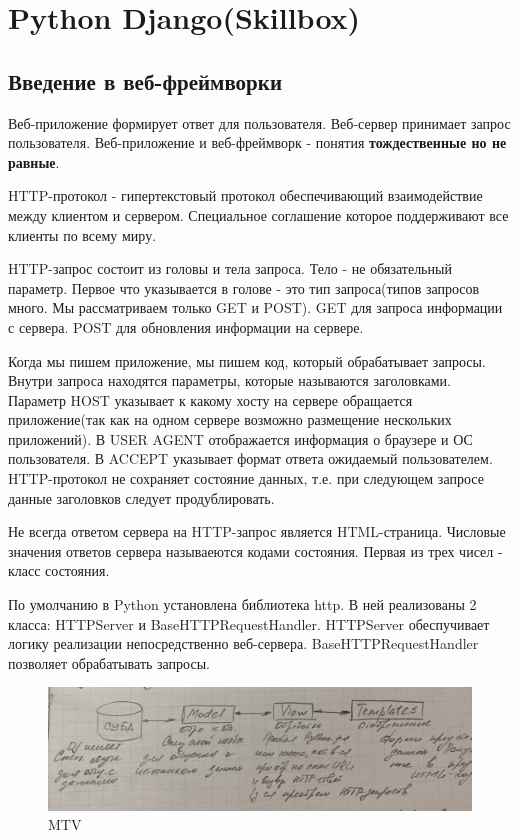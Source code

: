 \documentclass[%
	11pt,
	a4paper,
	utf8,
		]{article}
\begin{document}
\section{Python Django(Skillbox)}

\subsection{Введение в веб-фреймворки}

Веб-приложение формирует ответ для пользователя. Веб-сервер принимает запрос пользователя. Веб-приложение и веб-фреймворк - понятия \textbf{тождественные но не равные}.

HTTP-протокол - гипертекстовый протокол обеспечивающий взаимодействие между клиентом и сервером. Специальное соглашение которое поддерживают все клиенты по всему миру. 

HTTP-запрос состоит из головы и тела запроса. Тело - не обязательный параметр. Первое что указывается в голове - это тип запроса(типов запросов много. Мы рассматриваем только GET и POST). GET для запроса информации с сервера. POST для обновления информации на сервере.

Когда мы пишем приложение, мы пишем код, который обрабатывает запросы. Внутри запроса находятся параметры, которые называются заголовками. Параметр HOST указывает к какому хосту на сервере обращается приложение(так как на одном сервере возможно размещение нескольких приложений). В USER AGENT отображается информация о браузере и ОС пользователя. В ACCEPT указывает формат ответа ожидаемый пользователем. HTTP-протокол не сохраняет состояние данных, т.е. при следующем запросе данные заголовков следует продублировать.

Не всегда ответом сервера на HTTP-запрос является HTML-страница. Числовые значения ответов сервера называеются кодами состояния. Первая из трех чисел - класс состояния.

По умолчанию в Python установлена библиотека http. В ней реализованы 2 класса: HTTPServer и BaseHTTPRequestHandler. HTTPServer обеспучивает логику реализации непосредственно веб-сервера. BaseHTTPRequestHandler позволяет обрабатывать запросы.

\begin{figure}[h]
	\centering
	\includegraphics[scale=0.1]{figures/MTV.jpg}
	\caption{MTV}\label{fig:MTV}
\end{figure}
\end{document}
